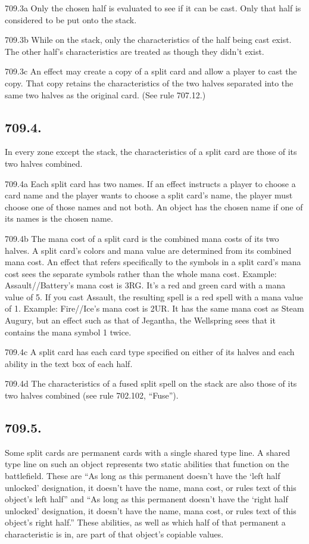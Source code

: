 709.3a Only the chosen half is evaluated to see if it can be cast. Only that half is considered to be put onto the stack.

709.3b While on the stack, only the characteristics of the half being cast exist. The other half’s characteristics are treated as though they didn’t exist.

709.3c An effect may create a copy of a split card and allow a player to cast the copy. That copy retains the characteristics of the two halves separated into the same two halves as the original card. (See rule 707.12.)

\subsection*{709.4.}
In every zone except the stack, the characteristics of a split card are those of its two halves combined.

709.4a Each split card has two names. If an effect instructs a player to choose a card name and the player wants to choose a split card’s name, the player must choose one of those names and not both. An object has the chosen name if one of its names is the chosen name.

709.4b The mana cost of a split card is the combined mana costs of its two halves. A split card’s colors and mana value are determined from its combined mana cost. An effect that refers specifically to the symbols in a split card’s mana cost sees the separate symbols rather than the whole mana cost.
Example: Assault//Battery’s mana cost is {3}{R}{G}. It’s a red and green card with a mana value of 5. If you cast Assault, the resulting spell is a red spell with a mana value of 1.
Example: Fire//Ice’s mana cost is {2}{U}{R}. It has the same mana cost as Steam Augury, but an effect such as that of Jegantha, the Wellspring sees that it contains the mana symbol {1} twice.

709.4c A split card has each card type specified on either of its halves and each ability in the text box of each half.

709.4d The characteristics of a fused split spell on the stack are also those of its two halves combined (see rule 702.102, “Fuse”).

\subsection*{709.5.}
Some split cards are permanent cards with a single shared type line. A shared type line on such an object represents two static abilities that function on the battlefield. These are “As long as this permanent doesn’t have the ‘left half unlocked’ designation, it doesn’t have the name, mana cost, or rules text of this object’s left half” and “As long as this permanent doesn’t have the ‘right half unlocked’ designation, it doesn’t have the name, mana cost, or rules text of this object’s right half.” These abilities, as well as which half of that permanent a characteristic is in, are part of that object’s copiable values.

